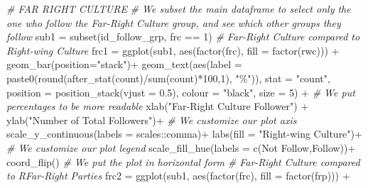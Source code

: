 \documentclass[
]{article}
\newenvironment{Shaded}{\begin{snugshade}}{\end{snugshade}}
\newcommand{\AttributeTok}[1]{\textcolor[rgb]{0.77,0.63,0.00}{#1}}
\newcommand{\CommentTok}[1]{\textcolor[rgb]{0.56,0.35,0.01}{\textit{#1}}}
\newcommand{\DecValTok}[1]{\textcolor[rgb]{0.00,0.00,0.81}{#1}}
\newcommand{\FloatTok}[1]{\textcolor[rgb]{0.00,0.00,0.81}{#1}}
\newcommand{\FunctionTok}[1]{\textcolor[rgb]{0.00,0.00,0.00}{#1}}
\newcommand{\NormalTok}[1]{#1}
\newcommand{\OtherTok}[1]{\textcolor[rgb]{0.56,0.35,0.01}{#1}}
\newcommand{\SpecialCharTok}[1]{\textcolor[rgb]{0.00,0.00,0.00}{#1}}
\newcommand{\StringTok}[1]{\textcolor[rgb]{0.31,0.60,0.02}{#1}}
\begin{document}
\begin{Shaded}
\begin{Highlighting}[]
\CommentTok{\# FAR RIGHT CULTURE}
\CommentTok{\# We subset the main dataframe to select only the one who follow the Far{-}Right Culture group, and see which other groups they follow}
\NormalTok{sub1 }\OtherTok{=} \FunctionTok{subset}\NormalTok{(id\_follow\_grp, frc }\SpecialCharTok{==} \DecValTok{1}\NormalTok{)}
\CommentTok{\# Far{-}Right Culture compared to Right{-}wing Culture}
\NormalTok{frc1 }\OtherTok{=} \FunctionTok{ggplot}\NormalTok{(sub1, }\FunctionTok{aes}\NormalTok{(}\FunctionTok{factor}\NormalTok{(frc), }\AttributeTok{fill =} \FunctionTok{factor}\NormalTok{(rwc))) }\SpecialCharTok{+}
  \FunctionTok{geom\_bar}\NormalTok{(}\AttributeTok{position=}\StringTok{"stack"}\NormalTok{)}\SpecialCharTok{+}
  \FunctionTok{geom\_text}\NormalTok{(}\FunctionTok{aes}\NormalTok{(}\AttributeTok{label =} \FunctionTok{paste0}\NormalTok{(}\FunctionTok{round}\NormalTok{(}\FunctionTok{after\_stat}\NormalTok{(count)}\SpecialCharTok{/}\FunctionTok{sum}\NormalTok{(count)}\SpecialCharTok{*}\DecValTok{100}\NormalTok{,}\DecValTok{1}\NormalTok{), }\StringTok{"\%"}\NormalTok{)), }\AttributeTok{stat =} \StringTok{"count"}\NormalTok{, }\AttributeTok{position =} \FunctionTok{position\_stack}\NormalTok{(}\AttributeTok{vjust =} \FloatTok{0.5}\NormalTok{), }\AttributeTok{colour =} \StringTok{"black"}\NormalTok{, }\AttributeTok{size =} \DecValTok{5}\NormalTok{) }\SpecialCharTok{+} \CommentTok{\# We put percentages to be more readable}
  \FunctionTok{xlab}\NormalTok{(}\StringTok{"Far{-}Right Culture Follower"}\NormalTok{) }\SpecialCharTok{+}
  \FunctionTok{ylab}\NormalTok{(}\StringTok{"Number of Total Followers"}\NormalTok{)}\SpecialCharTok{+} \CommentTok{\# We customize our plot axis}
  \FunctionTok{scale\_y\_continuous}\NormalTok{(}\AttributeTok{labels =}\NormalTok{ scales}\SpecialCharTok{::}\NormalTok{comma)}\SpecialCharTok{+}
  \FunctionTok{labs}\NormalTok{(}\AttributeTok{fill =} \StringTok{"Right{-}wing Culture"}\NormalTok{)}\SpecialCharTok{+} \CommentTok{\# We customize our plot legend}
  \FunctionTok{scale\_fill\_hue}\NormalTok{(}\AttributeTok{labels =} \FunctionTok{c}\NormalTok{(}\StringTok{\textquotesingle{}Not Follow\textquotesingle{}}\NormalTok{,}\StringTok{\textquotesingle{}Follow\textquotesingle{}}\NormalTok{))}\SpecialCharTok{+}
  \FunctionTok{coord\_flip}\NormalTok{() }\CommentTok{\# We put the plot in horizontal form}
\CommentTok{\# Far{-}Right Culture compared to RFar{-}Right Parties}
\NormalTok{frc2 }\OtherTok{=} \FunctionTok{ggplot}\NormalTok{(sub1, }\FunctionTok{aes}\NormalTok{(}\FunctionTok{factor}\NormalTok{(frc), }\AttributeTok{fill =} \FunctionTok{factor}\NormalTok{(frp))) }\SpecialCharTok{+}

\end{Highlighting}
\end{Shaded}
\end{document}
